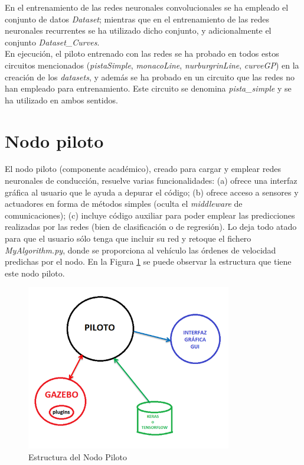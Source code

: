 En el entrenamiento de las redes neuronales convolucionales se ha empleado el conjunto de datos \textit{Dataset}; mientras que en el entrenamiento de las redes neuronales recurrentes se ha utilizado dicho conjunto, y adicionalmente el conjunto \textit{Dataset\_Curves}.\\

En ejecución, el piloto entrenado con las redes se ha probado en todos estos circuitos mencionados (\textit{pistaSimple}, \textit{monacoLine}, \textit{nurburgrinLine}, \textit{curveGP}) en la creación de los \textit{datasets}, y además se ha probado en un circuito que las redes no han empleado para entrenamiento. Este circuito se denomina \textit{pista\_simple} y se ha utilizado en ambos sentidos.


\section{Nodo piloto}

El nodo piloto (componente académico), creado para cargar y emplear redes neuronales de conducción, resuelve varias funcionalidades: (a) ofrece una interfaz gráfica al usuario que le ayuda a depurar el código; (b) ofrece acceso a sensores y actuadores en forma de métodos simples (oculta el \textit{middleware} de comunicaciones); (c) incluye código auxiliar para poder emplear las predicciones realizadas por las redes (bien de clasificación o de regresión). Lo deja todo atado para que el usuario sólo tenga que incluir su red y retoque el fichero \textit{MyAlgorithm.py}, donde se proporciona al vehículo las órdenes de velocidad predichas por el nodo. En la Figura \ref{fig.nodo_piloto} se puede observar la estructura que tiene este nodo piloto.\\

\begin{figure}[H]
  \begin{center}
    \includegraphics[width=0.8\textwidth]{figures/Infraestructura/nodo_piloto.png}
		\caption{Estructura del Nodo Piloto}
		\label{fig.nodo_piloto}
		\end{center}
\end{figure}

